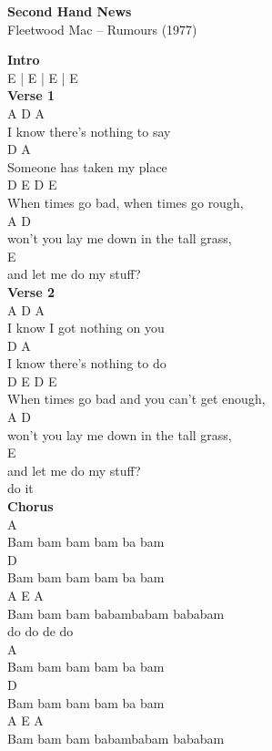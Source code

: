 \documentclass[a4paper]{article}
\begin{document}
    \begin{center}
        \textbf{Second Hand News}
        ~\\
        Fleetwood Mac -- Rumours (1977)
    \end{center}
    {
        \scriptsize
        \textbf{Intro}
        ~\\
        {
            \cutive
            \obeyspaces
E | E | E | E
\\

        }
        \textbf{Verse 1}
        ~\\
        {
            \cutive
            \obeyspaces
  A            D          A
\\
I know there's nothing to say
\\
            D        A
\\
Someone has taken my place
\\
     D        E         D        E
\\
When times go bad, when times go rough,
\\
          A                  D
\\
won't you lay me down in the tall grass,
\\
    E
\\
and let me do my stuff?
\\

        }
        \textbf{Verse 2}
        ~\\
        {
            \cutive
            \obeyspaces
  A          D          A
\\
I know I got nothing on you
\\
               D          A
\\
I know there's nothing to do
\\
     D        E           D         E
\\
When times go bad and you can't get enough,
\\
          A                  D
\\
won't you lay me down in the tall grass,
\\
    E
\\
and let me do my stuff?
\\
do it
\\

        }
        \textbf{Chorus}
        ~\\
        {
            \cutive
            \obeyspaces
A
\\
Bam bam bam bam ba bam
\\
D
\\
Bam bam bam bam ba bam
\\
A                      E   A
\\
Bam bam bam babambabam bababam
\\
do do de do
\\
A
\\
Bam bam bam bam ba bam
\\
D
\\
Bam bam bam bam ba bam
\\
A                      E   A
\\
Bam bam bam babambabam bababam
\\

}}
\end{document}
